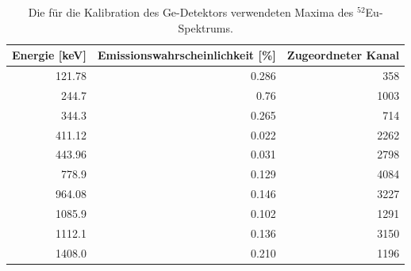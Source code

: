 \begin{table}[htb]
    \centering
    \caption{
        Die für die Kalibration des Ge-Detektors verwendeten Maxima des $^{52}$Eu-Spektrums.
    }
    \label{tab:maxima}
    \begin{tabular}{rrr}
        \toprule
        Energie [\si{keV}] & Emissionswahrscheinlichkeit [\si{\percent}] & Zugeordneter Kanal \\
        \midrule
        \num{121.78} & \num{0.286} & \num{ 358} \\
        \num{244.7 } & \num{ 0.76} & \num{1003} \\
        \num{344.3 } & \num{0.265} & \num{ 714} \\
        \num{411.12} & \num{0.022} & \num{2262} \\
        \num{443.96} & \num{0.031} & \num{2798} \\
        \num{778.9 } & \num{0.129} & \num{4084} \\
        \num{964.08} & \num{0.146} & \num{3227} \\
        \num{1085.9} & \num{0.102} & \num{1291} \\
        \num{1112.1} & \num{0.136} & \num{3150} \\
        \num{1408.0} & \num{0.210} & \num{1196} \\
        \bottomrule
    \end{tabular}
\end{table}
